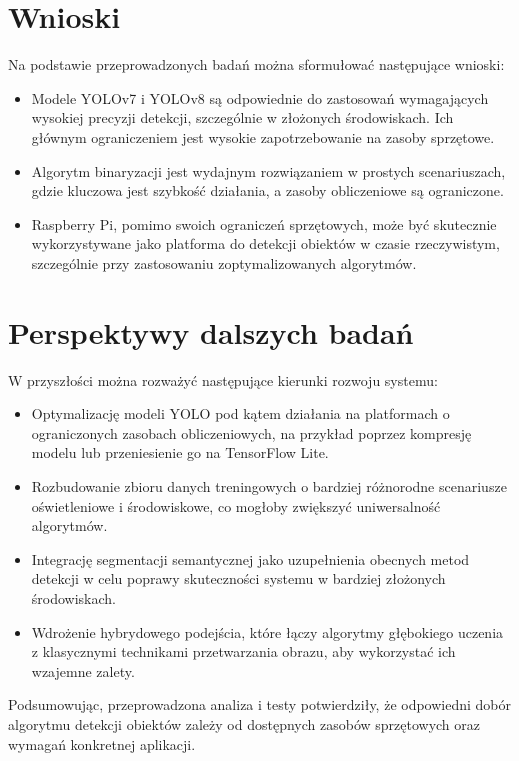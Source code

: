 \documentclass[a4paper,twoside,12pt]{book}
\begin{document}
\section{Wnioski}
Na podstawie przeprowadzonych badań można sformułować następujące wnioski:
\begin{itemize}
    \item Modele YOLOv7 i YOLOv8 są odpowiednie do zastosowań wymagających wysokiej precyzji detekcji, szczególnie w złożonych środowiskach. Ich głównym ograniczeniem jest wysokie zapotrzebowanie na zasoby sprzętowe.
    \item Algorytm binaryzacji jest wydajnym rozwiązaniem w prostych scenariuszach, gdzie kluczowa jest szybkość działania, a zasoby obliczeniowe są ograniczone.
    \item Raspberry Pi, pomimo swoich ograniczeń sprzętowych, może być skutecznie wykorzystywane jako platforma do detekcji obiektów w czasie rzeczywistym, szczególnie przy zastosowaniu zoptymalizowanych algorytmów.
\end{itemize}

\section{Perspektywy dalszych badań}
W przyszłości można rozważyć następujące kierunki rozwoju systemu:
\begin{itemize}
    \item Optymalizację modeli YOLO pod kątem działania na platformach o ograniczonych zasobach obliczeniowych, na przykład poprzez kompresję modelu lub przeniesienie go na TensorFlow Lite.
    \item Rozbudowanie zbioru danych treningowych o bardziej różnorodne scenariusze oświetleniowe i środowiskowe, co mogłoby zwiększyć uniwersalność algorytmów.
    \item Integrację segmentacji semantycznej jako uzupełnienia obecnych metod detekcji w celu poprawy skuteczności systemu w bardziej złożonych środowiskach.
    \item Wdrożenie hybrydowego podejścia, które łączy algorytmy głębokiego uczenia z klasycznymi technikami przetwarzania obrazu, aby wykorzystać ich wzajemne zalety.
\end{itemize}

Podsumowując, przeprowadzona analiza i testy potwierdziły, że odpowiedni dobór algorytmu detekcji obiektów zależy od dostępnych zasobów sprzętowych oraz wymagań konkretnej aplikacji.
\end{document}
